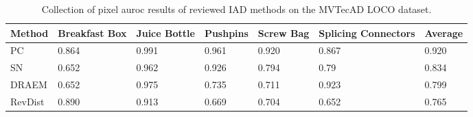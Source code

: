 \begin{table}[htbp]
    \tiny
    \centering
    \begin{tabularx}{\textwidth}{|X|X|X|X|X|X|X|}%
        \hline
        \textbf{Method} & \textbf{Breakfast Box} & \textbf{Juice Bottle} & \textbf{Pushpins} & \textbf{Screw Bag} & \textbf{Splicing Connectors} & \textbf{Average} \\
        \hline
        PC \cite{patchCore2022} & 0.864 & 0.991 & 0.961 & 0.920 & 0.867 & 0.920 \\
        \hline 
        SN \cite{liu2023simplenet} & 0.652 & 0.962 & 0.926 & 0.794 & 0.79 & 0.834 \\
        \hline
        DRAEM \cite{Zavrtanik_2021DRAEM} & 0.652 & 0.975 & 0.735 & 0.711 & 0.923 & 0.799 \\
        \hline
        RevDist \cite{revdist2023} & 0.890 & 0.913 & 0.669 & 0.704 & 0.652 & 0.765 \\
        \hline
    \end{tabularx}
    \caption{Collection of pixel auroc results of reviewed IAD methods on the MVTecAD LOCO \cite{LOCODentsAndScratchesBergmann2022} dataset.}
    \label{tab:pixelaurocloco}
\end{table}



